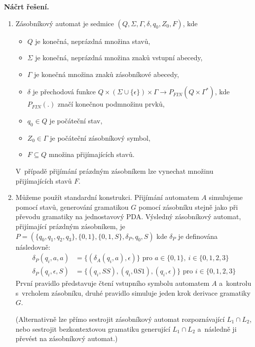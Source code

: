 \medskip
\noindent\textbf{Náčrt řešení.}\par
\begin{enumerate}
\item Zásobníkový automat je sedmice $(Q, \Sigma, \Gamma, \delta, q_0, Z_0, F)$, kde
  \begin{itemize}
  \item $Q$ je konečná, neprázdná množina stavů,
  \item $\Sigma$ je konečná, neprázdná množina znaků vstupní abecedy,
  \item $\Gamma$ je konečná množina znaků zásobníkové abecedy,
  \item $\delta$ je přechodová funkce $Q \times (\Sigma \cup \{\epsilon\}) \times
    \Gamma \to P_{FIN}(Q \times \Gamma^*)$, kde $P_{FIN}(.)$ značí konečnou
    podmnožinu prvků,
  \item $q_0 \in Q$ je počáteční stav,
  \item $Z_0 \in \Gamma$ je počáteční zásobníkový symbol,
  \item $F \subseteq Q$ množina přijímajících stavů.
  \end{itemize}
  V~případě přijímání prázdným zásobníkem lze vynechat množinu přijímajících stavů $F$.

\item Můžeme použít standardní konstrukci. Přijímání automatem $A$ simulujeme pomocí
  stavů, generování gramatikou $G$ pomocí zásobníku stejně jako při převodu gramatiky
  na jednostavový PDA. Výsledný zásobníkový automat, přijímající prázdným zásobníkem,
  je $P = (\{q_0, q_1, q_2, q_3\}, \{0, 1\}, \{0, 1, S\}, \delta_P, q_0, S)$ kde
  $\delta_P$ je definována následovně:
  \begin{align*}
    \delta_P(q_i, a, a) &= \{(\delta_A(q_i, a), \epsilon)\} \text{ pro } a \in \{0, 1\},\ i \in \{0, 1, 2, 3\}\\
    \delta_P(q_i, \epsilon, S) &= \{(q_i, SS), (q_i, 0S1), (q_i, \epsilon)\} \text{ pro } i \in \{0, 1, 2, 3\}
  \end{align*}
  První pravidlo představuje čtení vstupního symbolu automatem $A$ a~kontrolu
  s~vrcholem zásobníku, druhé pravidlo simuluje jeden krok derivace gramatiky $G$.

  (Alternativně lze přímo sestrojit zásobníkový automat rozpoznávající $L_1 \cap L_2$,
  nebo sestrojit bezkontextovou gramatiku generující $L_1 \cap L_2$ a~následně ji
  převést na zásobníkový automat.)
\end{enumerate}

